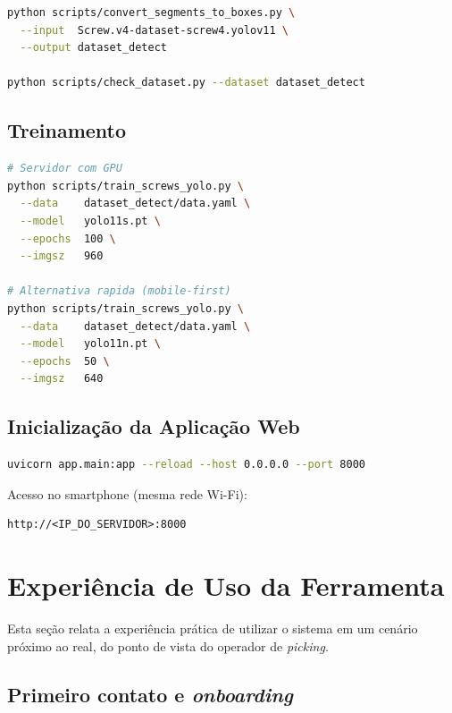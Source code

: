 \documentclass[12pt,a4paper]{article}
\begin{document}
\begin{lstlisting}[language=bash, caption={Convers\~ao e verifica\c{c}\~ao do dataset}]
python scripts/convert_segments_to_boxes.py \
  --input  Screw.v4-dataset-screw4.yolov11 \
  --output dataset_detect

python scripts/check_dataset.py --dataset dataset_detect
\end{lstlisting}

\subsection{Treinamento}

\begin{lstlisting}[language=bash, caption={Treinamento do modelo}]
# Servidor com GPU
python scripts/train_screws_yolo.py \
  --data    dataset_detect/data.yaml \
  --model   yolo11s.pt \
  --epochs  100 \
  --imgsz   960

# Alternativa rapida (mobile-first)
python scripts/train_screws_yolo.py \
  --data    dataset_detect/data.yaml \
  --model   yolo11n.pt \
  --epochs  50 \
  --imgsz   640
\end{lstlisting}

\subsection{Inicializa\c{c}\~ao da Aplica\c{c}\~ao Web}

\begin{lstlisting}[language=bash, caption={Inicializa\c{c}\~ao do servidor web}]
uvicorn app.main:app --reload --host 0.0.0.0 --port 8000
\end{lstlisting}

Acesso no smartphone (mesma rede Wi-Fi):
\begin{verbatim}
http://<IP_DO_SERVIDOR>:8000
\end{verbatim}

\section{Experi\^encia de Uso da Ferramenta}

Esta se\c{c}\~ao relata a experi\^encia pr\'atica de utilizar o sistema em um cen\'ario
pr\'oximo ao real, do ponto de vista do operador de \emph{picking}.

\subsection{Primeiro contato e \emph{onboarding}}
\end{document}
